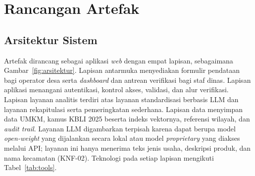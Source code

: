 \section{Rancangan Artefak}
\label{sec:artefak}

\subsection{Arsitektur Sistem}

Artefak dirancang sebagai aplikasi \textit{web} dengan empat lapisan, sebagaimana Gambar~\ref{fig:arsitektur}. Lapisan antarmuka menyediakan formulir pendataan bagi operator desa serta \textit{dashboard} dan antrean verifikasi bagi staf dinas. Lapisan aplikasi menangani autentikasi, kontrol akses, validasi, dan alur verifikasi. Lapisan layanan analitis terdiri atas layanan standardisasi berbasis LLM dan layanan rekapitulasi serta pemeringkatan sederhana. Lapisan data menyimpan data UMKM, kamus KBLI 2025 beserta indeks vektornya, referensi wilayah, dan \textit{audit trail}. Layanan LLM digambarkan terpisah karena dapat berupa model \textit{open-weight} yang dijalankan secara lokal atau model \textit{proprietary} yang diakses melalui API; layanan ini hanya menerima teks jenis usaha, deskripsi produk, dan nama kecamatan (KNF-02). Teknologi pada setiap lapisan mengikuti Tabel~\ref{tab:tools}.

